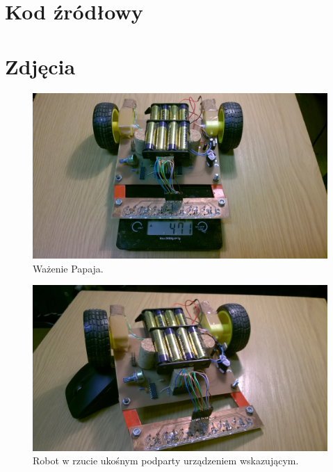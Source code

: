 \documentclass{article}
\begin{document}
\newpage

\section*{Kod źródłowy}


\newpage

\section*{Zdjęcia}

\begin{figure}[!htbp]
\centering
\includegraphics[scale=0.12]{./focie/wazymy_papaja.jpg}
\caption{Ważenie Papaja.}
\end{figure}

\begin{figure}[!htbp]
\centering
\includegraphics[scale=0.12]{./focie/oparcie_1.jpg}
\caption{Robot w rzucie ukośnym podparty urządzeniem wskazującym.}
\end{figure}
\end{document}
